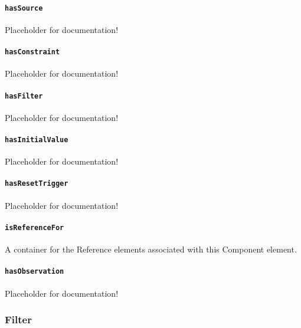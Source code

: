 \paragraph{\texttt{hasSource}}\mbox{}
\newline\tab Placeholder for documentation!

\paragraph{\texttt{hasConstraint}}\mbox{}
\newline\tab Placeholder for documentation!

\paragraph{\texttt{hasFilter}}\mbox{}
\newline\tab Placeholder for documentation!

\paragraph{\texttt{hasInitialValue}}\mbox{}
\newline\tab Placeholder for documentation!

\paragraph{\texttt{hasResetTrigger}}\mbox{}
\newline\tab Placeholder for documentation!

\paragraph{\texttt{isReferenceFor}}\mbox{}
\newline\tab A container for the Reference elements associated with this Component element.


\paragraph{\texttt{hasObservation}}\mbox{}
\newline\tab Placeholder for documentation!
\FloatBarrier
\subsubsection{Filter}
  \label{type:Filter}

\FloatBarrier


